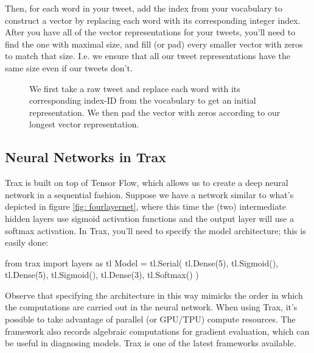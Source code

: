 \documentclass[12pt]{article}
\begin{document}
Then, for each word in your tweet, add the index from your vocabulary to construct a vector by replacing each word with its corresponding integer index. After you have all of the vector representations for your tweets, you'll need to find the one with maximal size, and fill (or pad) every smaller vector with zeros to match that size. I.e. we ensure that all our tweet representations have the same size even if our tweets don't.

\begin{figure}
  \begin{center}
\caption{We first take a raw tweet and replace each word with its corresponding index-ID from the vocabulary to get an initial representation. We then {\color{orange!80}pad} the vector with zeros according to our longest vector representation.}
  \end{center}
\end{figure}

\subsection{Neural Networks in Trax}
Trax is built on top of Tensor Flow, which allows us to create a deep neural network in a sequential fashion. Suppose we have a network similar to what's depicted in figure \ref{fig: fourlayernet}, where this time the (two) intermediate hidden layers use sigmoid activation functions and the output layer will use a softmax activation. In Trax, you'll need to specify the model architecture; this is easily done:
\begin{python}
from trax import layers as tl
Model = tl.Serial(
  tl.Dense(5),
  tl.Sigmoid(),
  tl.Dense(5),
  tl.Sigmoid(),
  tl.Dense(3),
  tl.Softmax()
)
\end{python}
Observe that specifying the architecture in this way mimicks the order in which the computations are carried out in the neural network. When using Trax, it's possible to take advantage of parallel (or GPU/TPU) compute resources. The framework also records algebraic computations for gradient evaluation, which can be useful in diagnosing models. Trax is one of the latest frameworks available.
\end{document}
